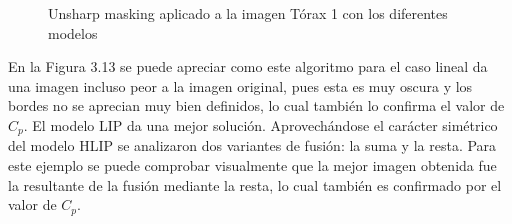 \begin{figure}
\begin{center}
		\caption{Unsharp masking aplicado a la imagen T\'orax 1 con los diferentes modelos}
	\end{center}
\end{figure}

En la Figura 3.13 se puede apreciar como este algoritmo para el caso lineal da una imagen incluso peor a la imagen original, pues esta es muy oscura y los bordes no se aprecian muy bien definidos, lo cual tambi\'en lo confirma el valor de $C_p$. El modelo LIP da una mejor soluci\'on. Aprovech\'andose el car\'acter sim\'etrico del modelo HLIP se analizaron dos variantes de fusi\'on: la suma y la resta. Para este ejemplo se puede comprobar visualmente que la mejor imagen obtenida fue la resultante de la fusi\'on mediante la resta, lo cual tambi\'en es confirmado por el valor de $C_p$. 


